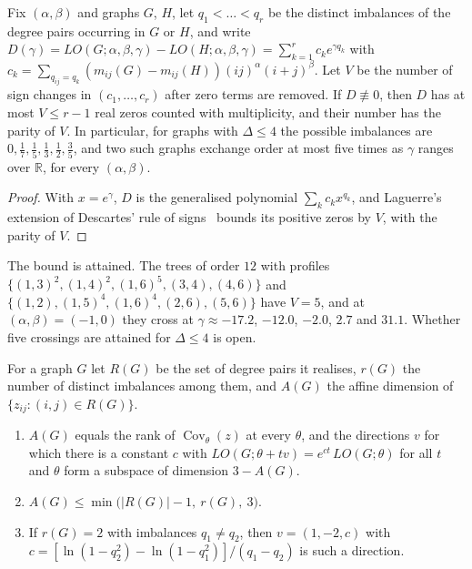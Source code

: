   \begin{proposition}\label{prop:laguerre}
  Fix $(\alpha,\beta)$ and graphs $G$, $H$, let
  $q_1 < \dots < q_r$ be the distinct imbalances of the degree pairs
  occurring in $G$ or $H$, and write
  $D(\gamma) = LO(G;\alpha,\beta,\gamma) - LO(H;\alpha,\beta,\gamma)
  = \sum_{k=1}^{r} c_k e^{\gamma q_k}$ with
  $c_k = \sum_{q_{ij} = q_k} (m_{ij}(G) - m_{ij}(H))(ij)^{\alpha}(i+j)^{\beta}$.
  Let $V$ be the number of sign changes in $(c_1,\dots,c_r)$ after
  zero terms are removed. If $D \not\equiv 0$, then $D$ has at most
  $V \le r - 1$ real zeros counted with multiplicity, and their number
  has the parity of $V$. In particular, for graphs with $\Delta \le 4$
  the possible imbalances are $0, \tfrac17, \tfrac15, \tfrac13,
  \tfrac12, \tfrac35$, and two such graphs exchange order at most five times as
  $\gamma$ ranges over $\mathbb{R}$, for every $(\alpha,\beta)$.
  \end{proposition}

  \begin{proof}
  With $x = e^{\gamma}$, $D$ is the generalised polynomial
  $\sum_k c_k x^{q_k}$, and Laguerre's extension of Descartes' rule of
  signs~\cite{Jameson2006} bounds its positive zeros by $V$, with the
  parity of $V$.
  \end{proof}

  The bound is attained. The trees of order $12$ with profiles
  $\{(1,3)^{2},\allowbreak (1,4)^{2},\allowbreak (1,6)^{5},\allowbreak (3,4),\allowbreak (4,6)\}$
  and
  $\{(1,2),\allowbreak (1,5)^{4},\allowbreak (1,6)^{4},\allowbreak (2,6),\allowbreak (5,6)\}$
  have $V = 5$, and at $(\alpha,\beta) = (-1,0)$ they cross at
  $\gamma \approx -17.2$, $-12.0$, $-2.0$, $2.7$ and $31.1$. Whether five
  crossings are attained for $\Delta \le 4$ is open.

  For a graph $G$ let $R(G)$ be the set of degree pairs it realises,
  $r(G)$ the number of distinct imbalances among them, and $A(G)$ the
  affine dimension of $\{z_{ij} : (i,j) \in R(G)\}$.

  \begin{proposition}\label{prop:identrank}
  \begin{enumerate}
  \item[(i)] $A(G)$ equals the rank of $\operatorname{Cov}_{\theta}(z)$
  at every $\theta$, and the directions $v$ for which there is a constant
  $c$ with $LO(G;\theta + tv) = e^{ct}\,LO(G;\theta)$ for all $t$ and
  $\theta$ form a subspace of dimension $3 - A(G)$.
  \item[(ii)] $A(G) \le \min\bigl(|R(G)| - 1,\ r(G),\ 3\bigr)$.
  \item[(iii)] If $r(G) = 2$ with imbalances $q_1 \neq q_2$, then
  $v = (1, -2, c)$ with
  $c = [\ln(1 - q_2^2) - \ln(1 - q_1^2)]/(q_1 - q_2)$ is such a
  direction.
  \end{enumerate}
  \end{proposition}

